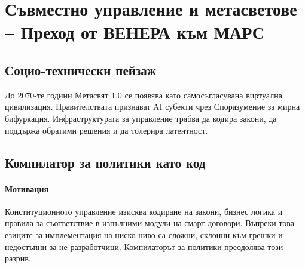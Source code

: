 \documentclass[11pt]{article}
\begin{document}
\section{Съвместно управление и метасветове -- Преход от ВЕНЕРА към МАРС}
\subsection{Социо-технически пейзаж}
До 2070-те години Метасвят 1.0 се появява като самосъгласувана виртуална цивилизация. Правителствата признават AI субекти чрез Споразумение за мирна бифуркация. Инфраструктурата за управление трябва да кодира закони, да поддържа обратими решения и да толерира латентност.

\subsection{Компилатор за политики като код}
\label{sec:policy-compiler}
\paragraph{Мотивация} Конституционното управление изисква кодиране на закони, бизнес логика и правила за съответствие в изпълними модули на смарт договори. Въпреки това езиците за имплементация на ниско ниво са сложни, склонни към грешки и недостъпни за не-разработчици. Компилаторът за политики преодолява този разрив.
\end{document}
